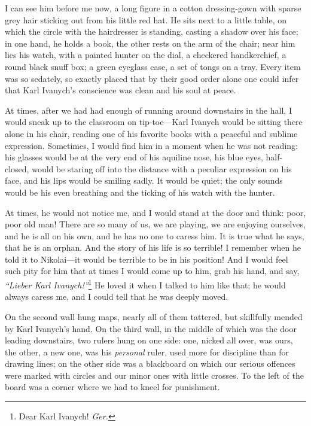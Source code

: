 I can see him before me now, a long figure in a cotton dressing-gown with sparse grey hair sticking out from his little red hat. He sits next to a little table, on which the circle with the hairdresser is standing, casting a shadow over his face; in one hand, he holds a book, the other rests on the arm of the chair; near him lies his watch, with a painted hunter on the dial, a checkered handkerchief, a round black snuff box; a green eyeglass case, a set of tongs on a tray.  Every item was so sedately, so exactly placed that by their good order alone one could infer that Karl Ivanych's conscience was clean and his soul at peace.

At times, after we had had enough of running around downstairs in the hall, I would sneak up to the classroom on tip-toe---Karl Ivanych would be sitting there alone in his chair, reading one of his favorite books with a peaceful and sublime expression. Sometimes, I would find him in a moment when he was not reading: his glasses would be at the very end of his aquiline nose, his blue eyes, half-closed, would be staring off into the distance with a peculiar expression on his face, and his lips would be smiling sadly. It would be quiet; the only sounds would be his even breathing and the ticking of his watch with the hunter.

At times, he would not notice me, and I would stand at the door and think: poor, poor old man! There are so many of us, we are playing, we are enjoying ourselves, and he is all on his own, and he has no one to caress him. It is true what he says, that he is an orphan. And the story of his life is so terrible! I remember when he told it to Nikolai---it would be terrible to be in his position! And I would feel such pity for him that at times I would come up to him, grab his hand, and say, \textit{``Lieber Karl Ivanych!''}\footnote{Dear Karl Ivanych! \textit{Ger.}} He loved it when I talked to him like that; he would always caress me, and I could tell that he was deeply moved.

On the second wall hung maps, nearly all of them tattered, but skillfully mended by Karl Ivanych's hand. On the third wall, in the middle of which was the door leading downstairs, two rulers hung on one side: one, nicked all over, was ours, the other, a new one, was his \emph{personal} ruler, used more for discipline than for drawing lines; on the other side was a blackboard on which our serious offences were marked with circles and our minor ones with little crosses. To the left of the board was a corner where we had to kneel for punishment.

